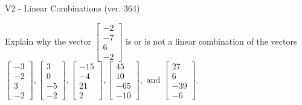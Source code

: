 \begin{exercise}
  \begin{exerciseTitle}V2 - Linear Combinations (ver. 364)\end{exerciseTitle}
  \begin{exerciseStatement}
    Explain why the vector \(\left[\begin{array}{c}
-2 \\
-7 \\
6 \\
-2
\end{array}\right]\)  is or is not a linear 
	combination of the vectors \(\left[\begin{array}{c}
-3 \\
-2 \\
3 \\
-2
\end{array}\right] , \left[\begin{array}{c}
3 \\
0 \\
-5 \\
-2
\end{array}\right] , \left[\begin{array}{c}
-15 \\
-4 \\
21 \\
2
\end{array}\right] , \left[\begin{array}{c}
45 \\
10 \\
-65 \\
-10
\end{array}\right] , \text{ and } \left[\begin{array}{c}
27 \\
6 \\
-39 \\
-6
\end{array}\right]\).
	



\end{exerciseStatement}
\end{exercise}
